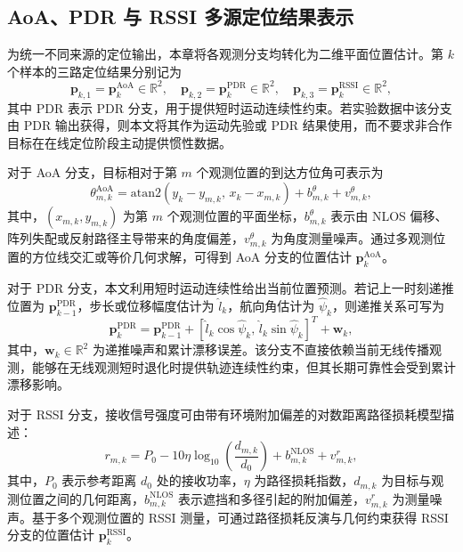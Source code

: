 \subsection{AoA、PDR 与 RSSI 多源定位结果表示}
\label{subsec:3_1_2}

为统一不同来源的定位输出，本章将各观测分支均转化为二维平面位置估计。第 \(k\) 个样本的三路定位结果分别记为
\begin{equation}
\mathbf{p}_{k,1}
=
\mathbf{p}_{k}^{\mathrm{AoA}}
\in\mathbb{R}^{2},
\quad
\mathbf{p}_{k,2}
=
\mathbf{p}_{k}^{\mathrm{PDR}}
\in\mathbb{R}^{2},
\quad
\mathbf{p}_{k,3}
=
\mathbf{p}_{k}^{\mathrm{RSSI}}
\in\mathbb{R}^{2},
\label{eq:3_2_multi_source_position}
\end{equation}
其中 \(\mathrm{PDR}\) 表示 PDR 分支，用于提供短时运动连续性约束。若实验数据中该分支由 PDR 输出获得，则本文将其作为运动先验或 PDR 结果使用，而不要求非合作目标在在线定位阶段主动提供惯性数据。

对于 AoA 分支，目标相对于第 \(m\) 个观测位置的到达方位角可表示为
\begin{equation}
\theta_{m,k}^{\mathrm{AoA}}
=
\mathrm{atan2}(y_k-y_{m,k},\,x_k-x_{m,k})
+
b_{m,k}^{\theta}
+
v_{m,k}^{\theta},
\label{eq:3_1_aoa_branch}
\end{equation}
其中，\((x_{m,k},y_{m,k})\) 为第 \(m\) 个观测位置的平面坐标，\(b_{m,k}^{\theta}\) 表示由 NLOS 偏移、阵列失配或反射路径主导带来的角度偏差，\(v_{m,k}^{\theta}\) 为角度测量噪声。通过多观测位置的方位线交汇或等价几何求解，可得到 AoA 分支的位置估计 \(\mathbf{p}_{k}^{\mathrm{AoA}}\)。

对于 PDR 分支，本文利用短时运动连续性给出当前位置预测。若记上一时刻递推位置为 \(\mathbf{p}_{k-1}^{\mathrm{PDR}}\)，步长或位移幅度估计为 \(\hat{l}_k\)，航向角估计为 \(\hat{\psi}_k\)，则递推关系可写为
\begin{equation}
 \mathbf{p}_{k}^{\mathrm{PDR}}
=
\mathbf{p}_{k-1}^{\mathrm{PDR}}
+
\left[
\hat{l}_k\cos \hat{\psi}_k,\,
\hat{l}_k\sin \hat{\psi}_k
\right]^T
+
\mathbf{w}_k,
\label{eq:3_1_pdr_branch}
\end{equation}
其中，\(\mathbf{w}_k\in\mathbb{R}^{2}\) 为递推噪声和累计漂移误差。该分支不直接依赖当前无线传播观测，能够在无线观测短时退化时提供轨迹连续性约束，但其长期可靠性会受到累计漂移影响。

对于 RSSI 分支，接收信号强度可由带有环境附加偏差的对数距离路径损耗模型描述：
\begin{equation}
r_{m,k}
=
P_0
-
10\eta\log_{10}\!\left(\frac{d_{m,k}}{d_0}\right)
+
b_{m,k}^{\mathrm{NLOS}}
+
v_{m,k}^{r},
\label{eq:3_1_rssi_branch}
\end{equation}
其中，\(P_0\) 表示参考距离 \(d_0\) 处的接收功率，\(\eta\) 为路径损耗指数，\(d_{m,k}\) 为目标与观测位置之间的几何距离，\(b_{m,k}^{\mathrm{NLOS}}\) 表示遮挡和多径引起的附加偏差，\(v_{m,k}^{r}\) 为测量噪声。基于多个观测位置的 RSSI 测量，可通过路径损耗反演与几何约束获得 RSSI 分支的位置估计 \(\mathbf{p}_{k}^{\mathrm{RSSI}}\)。

